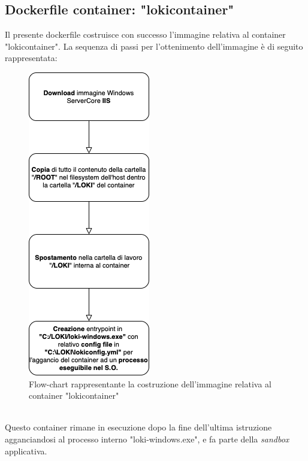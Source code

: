 \subsection{Dockerfile container: "lokicontainer"}
Il presente dockerfile costruisce con successo l'immagine relativa al container "lokicontainer". La sequenza di passi per l'ottenimento dell'immagine è di seguito rappresentata:
\begin{figure}[!h]     
\centering 
    \includegraphics[width=0.3\columnwidth]{immagini/flowchart/flowchart_lokicontainer} 
    \caption{Flow-chart rappresentante la costruzione dell'immagine relativa al container "lokicontainer"}
\end{figure} \\
Questo container rimane in esecuzione dopo la fine dell'ultima istruzione agganciandosi al processo interno "loki-windows.exe", e fa parte della \textit{sandbox} applicativa.
\newpage
